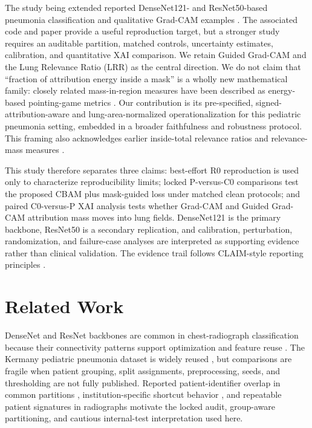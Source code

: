 \documentclass[runningheads]{llncs}
\newcommand{\citep}[1]{\cite{#1}}
\begin{document}
The study being extended reported DenseNet121- and ResNet50-based pneumonia
classification and qualitative Grad-CAM examples
\citep{erukude2025,erukude_repo2026}. The associated code and paper
provide a useful reproduction target, but a stronger study requires an auditable
partition, matched controls, uncertainty estimates, calibration, and
quantitative XAI comparison. We retain Guided Grad-CAM and the Lung Relevance Ratio (LRR) as the
central direction. We do not claim that ``fraction of attribution energy inside a
mask'' is a wholly new mathematical family: closely related mass-in-region measures
have been described as energy-based pointing-game metrics \citep{wang2020}. Our
contribution is its pre-specified, signed-attribution-aware and lung-area-normalized
operationalization for this pediatric pneumonia setting, embedded in a broader
faithfulness and robustness protocol. This framing also acknowledges earlier
inside-total relevance ratios and relevance-mass measures
\citep{kohlbrenner2020,arras2022}.

This study therefore separates three claims: best-effort R0 reproduction is used
only to characterize reproducibility limits; locked P-versus-C0 comparisons test
the proposed CBAM plus mask-guided loss under matched clean protocols; and paired
C0-versus-P XAI analysis tests whether Grad-CAM and Guided Grad-CAM attribution
mass moves into lung fields. DenseNet121 is the primary backbone, ResNet50 is a
secondary replication, and calibration, perturbation, randomization, and
failure-case analyses are interpreted as supporting evidence rather than clinical
validation. The evidence trail follows CLAIM-style reporting principles
\citep{tejani2024}.

\section{Related Work}

DenseNet and ResNet backbones are common in chest-radiograph classification
because their connectivity patterns support optimization and feature reuse
\citep{he2016,huang2017,rajpurkar2017}. The Kermany pediatric pneumonia dataset is
widely reused \citep{kermany2018}, but comparisons are fragile when patient
grouping, split assignments, preprocessing, seeds, and thresholding are not fully
published. Reported patient-identifier overlap in common partitions
\citep{ouerhani2026}, institution-specific shortcut behavior \citep{zech2018}, and
repeatable patient signatures in radiographs \citep{packhauser2022} motivate the
locked audit, group-aware partitioning, and cautious internal-test interpretation
used here.
\end{document}
